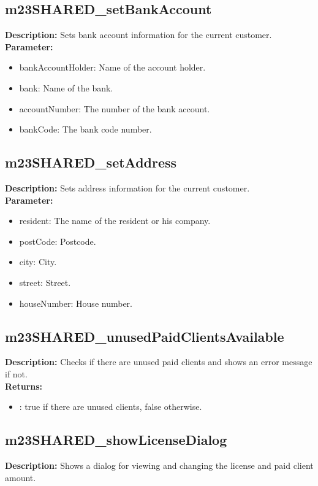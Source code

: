 \subsection{m23SHARED\_setBankAccount}
\textbf{Description:} Sets bank account information for the current customer.\\
\textbf{Parameter:}
\begin{itemize}
\item bankAccountHolder: Name of the account holder.
\item bank: Name of the bank.
\item accountNumber: The number of the bank account.
\item bankCode: The bank code number.
\end{itemize}

\subsection{m23SHARED\_setAddress}
\textbf{Description:} Sets address information for the current customer.\\
\textbf{Parameter:}
\begin{itemize}
\item resident: The name of the resident or his company.
\item postCode: Postcode.
\item city: City.
\item street: Street.
\item houseNumber: House number.
\end{itemize}

\subsection{m23SHARED\_unusedPaidClientsAvailable}
\textbf{Description:} Checks if there are unused paid clients and shows an error message if not.\\
\textbf{Returns:}
\begin{itemize}
\item : true if there are unused clients, false otherwise.
\end{itemize}

\subsection{m23SHARED\_showLicenseDialog}
\textbf{Description:} Shows a dialog for viewing and changing the license and paid client amount.\\


